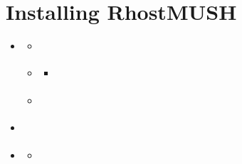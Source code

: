 \documentclass[letterpaper,10pt,english]{sphinxmanual}
\begin{document}
\chapter{Installing RhostMUSH}
\label{\detokenize{install:installing-rhostmush}}\label{\detokenize{install:id1}}\label{\detokenize{install::doc}}
\begin{sphinxShadowBox}
\begin{itemize}
\item {} 
\sphinxAtStartPar
{}\label{\detokenize{install:id10}}{\hyperref[\detokenize{install:rhostmush-requirements}]{}}
\begin{itemize}
\item {} 
\sphinxAtStartPar
{}\label{\detokenize{install:id11}}{\hyperref[\detokenize{install:system-requirements}]{}}

\item {} 
\sphinxAtStartPar
{}\label{\detokenize{install:id12}}{\hyperref[\detokenize{install:software-requirements}]{}}
\begin{itemize}
\item {} 
\sphinxAtStartPar
{}\label{\detokenize{install:id13}}{\hyperref[\detokenize{install:optional-packages}]{}}

\end{itemize}

\item {} 
\sphinxAtStartPar
{}\label{\detokenize{install:id14}}{\hyperref[\detokenize{install:hosting-requirements}]{}}

\end{itemize}

\item {} 
\sphinxAtStartPar
{}\label{\detokenize{install:id15}}{\hyperref[\detokenize{install:obtaining-rhostmush-source-code}]{}}

\item {} 
\sphinxAtStartPar
{}\label{\detokenize{install:id16}}{\hyperref[\detokenize{install:options-for-making-a-mush}]{}}
\begin{itemize}
\item {} 
\sphinxAtStartPar
{}\label{\detokenize{install:id17}}{\hyperref[\detokenize{install:compile-time-options}]{}}


\end{itemize}
\end{itemize}
\end{sphinxShadowBox}
\end{document}

